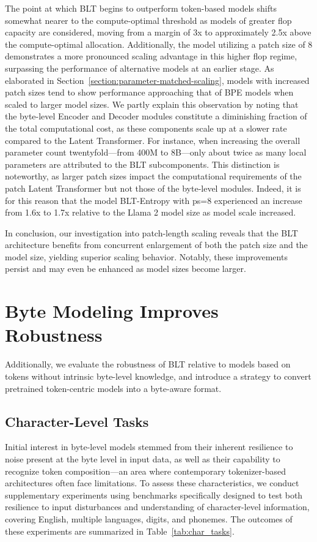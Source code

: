 The point at which {\textsc BLT} begins to outperform token-based models shifts somewhat nearer to the compute-optimal threshold as models of greater flop capacity are considered, moving from a margin of 3x to approximately 2.5x above the compute-optimal allocation. Additionally, the model utilizing a patch size of 8 demonstrates a more pronounced scaling advantage in this higher flop regime, surpassing the performance of alternative models at an earlier stage. As elaborated in Section~\ref{section:parameter-matched-scaling}, models with increased patch sizes tend to show performance approaching that of BPE models when scaled to larger model sizes. We partly explain this observation by noting that the byte-level Encoder and Decoder modules constitute a diminishing fraction of the total computational cost, as these components scale up at a slower rate compared to the Latent Transformer. For instance, when increasing the overall parameter count twentyfold—from 400M to 8B—only about twice as many local parameters are attributed to the {\textsc BLT} subcomponents. This distinction is noteworthy, as larger patch sizes impact the computational requirements of the patch Latent Transformer but not those of the byte-level modules. Indeed, it is for this reason that the model {\textsc BLT}-Entropy with ps=8 experienced an increase from 1.6x to 1.7x relative to the Llama 2 model size as model scale increased.

In conclusion, our investigation into patch-length scaling reveals that the {\textsc BLT} architecture benefits from concurrent enlargement of both the patch size and the model size, yielding superior scaling behavior. Notably, these improvements persist and may even be enhanced as model sizes become larger.

\section{Byte Modeling Improves Robustness} Additionally, we evaluate the robustness of {\textsc BLT} relative to models based on tokens without intrinsic byte-level knowledge, and introduce a strategy to convert pretrained token-centric models into a byte-aware format.
\label{sec:robustness}

\subsection{Character-Level Tasks}

Initial interest in byte-level models stemmed from their inherent resilience to noise present at the byte level in input data, as well as their capability to recognize token composition—an area where contemporary tokenizer-based architectures often face limitations. To assess these characteristics, we conduct supplementary experiments using benchmarks specifically designed to test both resilience to input disturbances and understanding of character-level information, covering English, multiple languages, digits, and phonemes. The outcomes of these experiments are summarized in Table~\ref{tab:char_tasks}.

